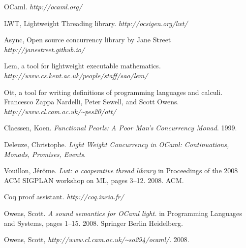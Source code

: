\begin{thebibliography}{9}

 OCaml.
 \emph{http://ocaml.org/}

 LWT, Lightweight Threading library.
 \emph{http://ocsigen.org/lwt/}

 Async, Open source concurrency library by Jane Street
 \emph{http://janestreet.github.io/}
 
 Lem, a tool for lightweight executable mathematics.\newline
 \emph{http://www.cs.kent.ac.uk/people/staff/sao/lem/}
 
  Ott, a tool for writing definitions of programming languages and calculi.
  Francesco Zappa Nardelli, Peter Sewell, and Scott Owens.\newline
 \emph{http://www.cl.cam.ac.uk/\textasciitilde pes20/ott/}

  Claessen, Koen.
  \emph{Functional Pearls: A Poor Man's Concurrency Monad}.
  1999.

  Deleuze, Christophe.
  \emph{Light Weight Concurrency in OCaml: Continuations, Monads, Promises, Events}.

  Vouillon, J{\'e}r{\^o}me.
  \emph{Lwt: a cooperative thread library} in Proceedings of the 2008 ACM SIGPLAN workshop on ML, pages 3--12.
  2008.
  ACM.
 
 Coq proof assistant.
 \emph{http://coq.inria.fr/}

 Owens, Scott.
 \emph{A sound semantics for OCaml light.} in Programming Languages and Systems, pages 1--15.
 2008.
 Springer Berlin Heidelberg.
 
 Owens, Scott,
 \emph{http://www.cl.cam.ac.uk/\textasciitilde so294/ocaml/}.
 2008.
 


\end{thebibliography}
